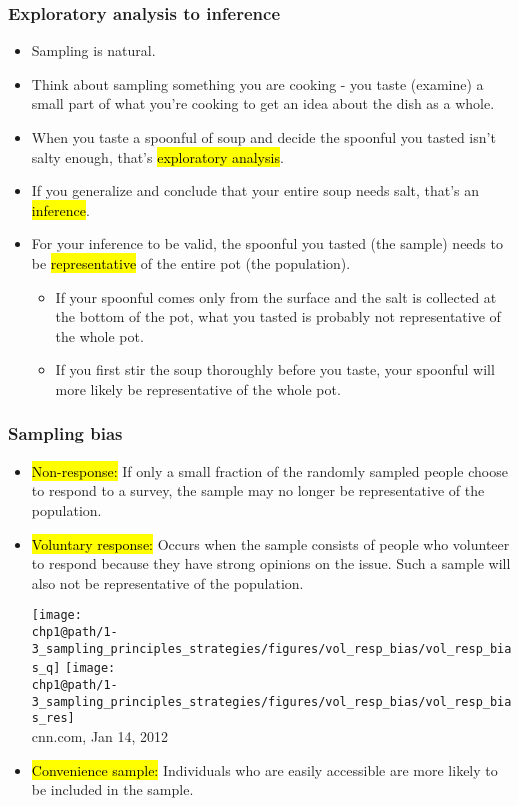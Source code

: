 \documentclass[slidestop,compress,mathserif]{beamer}
\makeatletter
\def\chp1@path{../../Chp 1}
\makeatother
\begin{document}
\begin{frame}
\frametitle{Exploratory analysis to inference}

	\begin{itemize}
	\setlength\leftskip{-2em}
		\item Sampling is natural.
		\pause
		\item Think about sampling something you are cooking - you taste (examine) a small part of what you're cooking to get an idea about the dish as a whole.
		\pause
		\item When you taste a spoonful of soup and decide the spoonful you tasted isn't salty enough, that's \hl{exploratory analysis}.
		\pause
		\item If you generalize and conclude that your entire soup needs salt, that's an \hl{inference}.
		\pause
		\item For your inference to be valid, the spoonful you tasted (the sample) needs to be \hl{representative} of the entire pot (the population).

		\begin{itemize}
			\item If your spoonful comes only from the surface and the salt is collected at the bottom of the pot, what you tasted is probably not representative of the whole pot.
			\item If you first stir the soup thoroughly before you taste, your spoonful will more likely be representative of the whole pot.
		\end{itemize}

	\end{itemize}

\end{frame}


\begin{frame}
	\frametitle{Sampling bias}

	\begin{itemize}
		\item \hl{Non-response:} If only a small fraction of the randomly sampled people choose to respond to a survey, the sample may no longer be representative of the population.
		\pause
		\item \hl{Voluntary response:} Occurs when the sample consists of people who volunteer to respond because they have strong opinions on the issue. Such a sample will also not be representative of the population.
		\pause
		\begin{center}
		\texttt{[image: \\chp1@path/1-3\_sampling\_principles\_strategies/figures/vol\_resp\_bias/vol\_resp\_bias\_q]}\pause
		\texttt{[image: \\chp1@path/1-3\_sampling\_principles\_strategies/figures/vol\_resp\_bias/vol\_resp\_bias\_res]} \\
		{\tiny cnn.com, Jan 14, 2012}
		\end{center}
		\pause
		\item \hl{Convenience sample:} Individuals who are easily accessible are more likely to be included in the sample.

	\end{itemize}

\end{frame}
\end{document}
